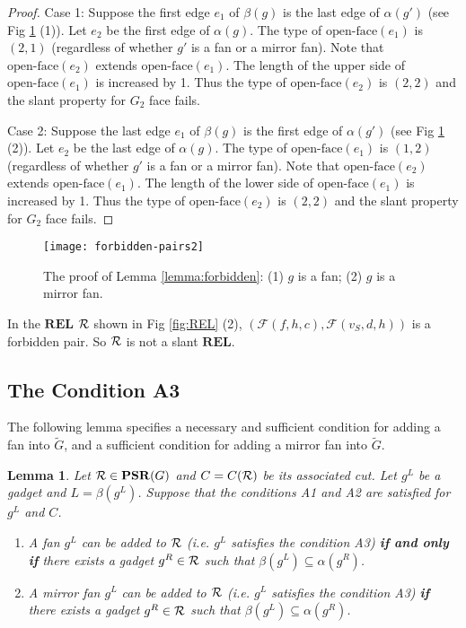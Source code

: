 \documentclass[11pt]{article}
\newcommand{\R}{{\cal R}}
\newcommand{\FF}{\mathcal{F}}
\newcommand{\REL}{\mathbf{REL}}
\newcommand{\PSR}{\mathbf{PSR}}
\newtheorem{lemma}[figure]{Lemma}
\begin{document}
\begin{proof}
Case 1: Suppose the first edge $e_1$ of $\beta(g)$ is the last edge
of $\alpha(g')$ (see Fig \ref{fig:forbbiden} (1)). Let $e_2$ be the
first edge of $\alpha(g)$. The type of $\mbox{open-face}(e_1)$ is
$(2,1)$ (regardless of whether $g'$ is a fan or a mirror fan). Note
that $\mbox{open-face}(e_2)$ extends $\mbox{open-face}(e_1)$.
The length of the upper side of $\mbox{open-face}(e_1)$ is increased
by 1. Thus the type of $\mbox{open-face}(e_2)$ is $(2,2)$ and
the slant property for $G_2$ face fails.

Case 2: Suppose the last edge $e_1$ of $\beta(g)$ is the first edge
of $\alpha(g')$ (see Fig \ref{fig:forbbiden} (2)). Let $e_2$ be
the last edge of $\alpha(g)$. The type of $\mbox{open-face}(e_1)$
is $(1,2)$ (regardless of whether $g'$ is a fan or a mirror fan).
Note that $\mbox{open-face}(e_2)$ extends $\mbox{open-face}(e_1)$.
The length of the lower side of $\mbox{open-face}(e_1)$ is increased
by 1. Thus the type of $\mbox{open-face}(e_2)$ is $(2,2)$ and
the slant property for $G_2$ face fails.
\end{proof}

\begin{figure}[ht]
\begin{center}
\texttt{[image: forbidden-pairs2]}
  \centering
\caption{The proof of Lemma \ref{lemma:forbidden}: (1) $g$ is
a fan; (2) $g$ is a mirror fan.}
\label{fig:forbbiden}
\end{center}
\end{figure}


In the $\REL$ $\R$ shown in Fig \ref{fig:REL} (2), $(\FF(f,h,c),\FF(v_S,d,h))$
is a forbidden pair. So $\R$ is not a slant $\REL$.

\subsection{The Condition A3}

The following lemma specifies a necessary
and sufficient condition for adding a fan into $\tilde{G}$, and
a sufficient condition for adding a mirror fan into $\tilde{G}$.

\begin{lemma}\label{lemma:valid-fan}
Let $\R\in \PSR(G)$ and $C = C(\R)$ be its associated cut.
Let $g^L$ be a gadget and $L=\beta(g^L)$. Suppose that the conditions
A1 and A2 are satisfied for $g^L$ and $C$.
\begin{enumerate}
\item A fan $g^L$ can be added to $\R$ (i.e. $g^L$ satisfies the condition A3)
{\bf if and only if} there exists a gadget $g^R \in \R$ such that
$\beta(g^L)\subseteq \alpha(g^R)$.
\item A mirror fan $g^L$ can be added to $\R$ (i.e. $g^L$ satisfies the
condition A3) {\bf if} there exists a gadget $g^R \in \R$ such that
$\beta(g^L)\subseteq \alpha(g^R)$.
\end{enumerate}
\end{lemma}
\end{document}
